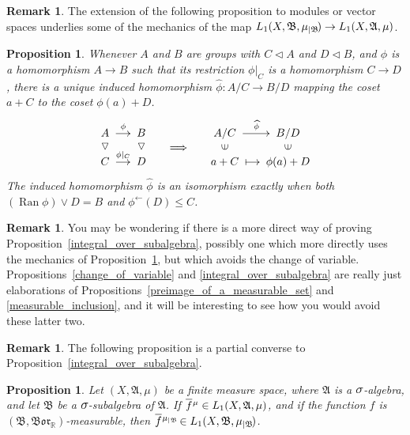 \documentclass[
twoside=true,
paper=letter,
fontsize=9pt,
pagesize=auto,
leqno,
openany,
headsepline,
overfullrule,
]{scrbook}
\theoremstyle{plain}
\theoremstyle{plain}
\newtheorem{prop}[thm]{Proposition}
\theoremstyle{definition}
\newtheorem{rmk}[thm]{Remark}
\theoremstyle{bfnoteitalic}
\theoremstyle{bfnoteroman}
\newcommand{\sigalg}[1]{\mathfrak{#1}}
\newcommand{\normalin}{\vartriangleleft}
\newcommand{\normalup}{\rotatebox{90}{$\normalin$}}
\newcommand{\elementup}{\rotatebox{90}{$\in$}}
\DeclareMathOperator{\range}{Ran}
\newcommand{\borel}{\mathfrak{Bor}}
\newcommand{\textsigma}{\hbox{\large{$\sigma$}}\kern-1pt}
\newcommand{\restrictedto}[1]{_{\lvert#1}\kern-1.5pt}
\newcommand{\preimage}[1]{#1^{\leftarrow}}
\newcommand{\R}{\mathbb{R}}
\newcommand{\sigmaalgebra}{\sigalg{A}}
\newcommand{\sigmaalgebraii}{\sigalg{B}}
\newcommand{\measurespace}{X}
\newcommand{\measure}{\mu}
\newcommand*\xbar[1]{%
   \hbox{%
     \vbox{%
       \hrule height 0.4pt %
       \kern0.4ex%
       \hbox{%
         \ensuremath{#1}%
       }%
     }%
   }%
}
\newcommand{\lebclass}[1]{\hspace{.5pt}\xbar{#1}\hspace{0.5pt}}
\newcommand{\ellclass}[2]{\lebclass{#1}^{#2}}
\begin{document}
\begin{rmk}
The extension of the following proposition to modules or vector spaces underlies some of the mechanics of the map
$L_1(\measurespace, \sigmaalgebraii, \measure\restrictedto{\sigmaalgebraii})
\to
L_1(\measurespace, \sigmaalgebra, \measure)$.
\end{rmk}


\begin{prop}\label{induced_quotient_homomorphism}
Whenever $A$ and $B$ are groups with $C\normalin A$ and $D\normalin B$, and $\phi$ is a homomorphism ${A\to B}$ such that its restriction $\phi\vert_C$ is a homomorphism $C\to D$, there is a unique induced homomorphism ${\widehat \phi :A/C\to B/D}$ mapping the coset $a+C$ to the coset $\phi(a)+D$. 
\[
\xymatrix@R=-2pt@C=12pt{
\ A\  \ar[r]^{\phi} & \ B\  & & \ A/C\ \ar[r]^{\widehat \phi} & \ B/D\ \\
\normalup & \normalup & \Longrightarrow & \elementup & \elementup \\
\ C\ \ar[r]^{\phi\vert_C} & \ D\  & & \ a+C\ \ar@{|->}[r] & \ \phi(a)+D\ }
\]
The induced homomorphism $\widehat \phi$ is an isomorphism exactly when both  $(\range \phi) \vee D = B$ and $\preimage{\phi}(D)\leq C$. 
\end{prop}

\begin{rmk}
You may be wondering if there is a more direct way of proving Proposition~\ref{integral_over_subalgebra}, possibly one which more directly uses the mechanics of Proposition~\ref{induced_quotient_homomorphism}, but which avoids the change of variable.  
Propositions~\ref{change_of_variable} and \ref{integral_over_subalgebra} are really just elaborations of Propositions~\ref{preimage_of_a_measurable_set} and \ref{measurable_inclusion}, and it will be interesting to see how you would avoid these latter two.
\end{rmk}








\begin{rmk}
The following proposition is a partial converse to Proposition~\ref{integral_over_subalgebra}.
\end{rmk}


\begin{prop}\label{algebra_to_subalgebra}
Let $(\measurespace, \sigmaalgebra, \measure)$ be a finite measure space, where $\sigmaalgebra$ is a $\textsigma$-algebra, and let $\sigmaalgebraii$ be a $\textsigma$-subalgebra of $\sigmaalgebra$. 
If $\ellclass{f}{\measure} 
\in L_1(\measurespace, \sigmaalgebra, \measure)$, and if the function $f$ is $(\sigmaalgebraii, \borel_\R)$\hyp{}measurable, then
$\ellclass{f}{\measure\restrictedto{\sigmaalgebraii}}
\in L_1(\measurespace, \sigmaalgebraii, \measure\restrictedto{\sigmaalgebraii})$.
\end{prop}
\end{document}
